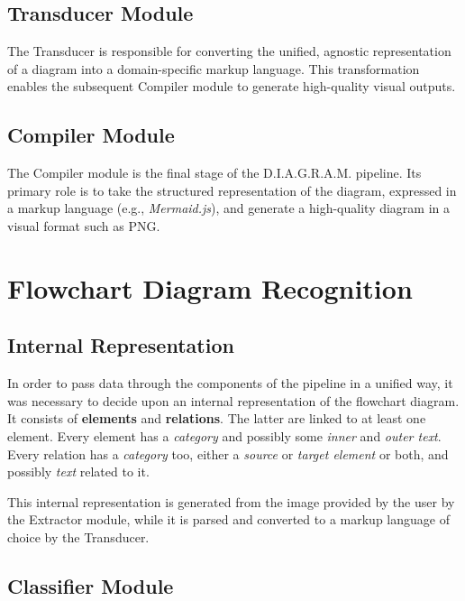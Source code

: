 \documentclass[conference]{IEEEtran}
\begin{document}
\subsection{Transducer Module}
The Transducer is responsible for converting the unified, agnostic representation of a diagram into a domain-specific markup language. 
This transformation enables the subsequent Compiler module to generate high-quality visual outputs.
\subsection{Compiler Module}
The Compiler module is the final stage of the D.I.A.G.R.A.M. pipeline. 
Its primary role is to take the structured representation of the diagram, expressed in a markup language (e.g., \textit{Mermaid.js}), and generate a high-quality diagram in a visual format such as PNG. 

% 
%
\section{Flowchart Diagram Recognition}

\subsection{Internal Representation}
In order to pass data through the components of the pipeline in a unified way, it was necessary to decide upon an internal representation of the flowchart diagram. It consists of \textbf{elements} and \textbf{relations}. The latter are linked to at least one element. Every element has a \textit{category} and possibly some \textit{inner} and \textit{outer text}. Every relation has a \textit{category} too, either a \textit{source} or \textit{target element} or both, and possibly \textit{text} related to it.

This internal representation is generated from the image provided by the user by the Extractor module, while it is parsed and converted to a markup language of choice by the Transducer. 

\subsection{Classifier Module}
\end{document}
